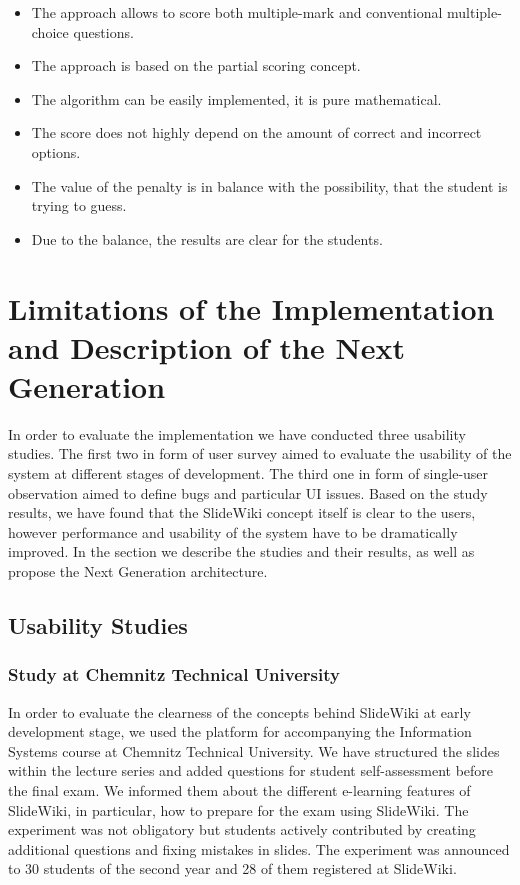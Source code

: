 \documentclass[ngerman,UKenglish,table]{scrbook}
\begin{document}
\begin{itemize}
  \item The approach allows to score both multiple-mark and conventional multiple-choice questions.
  \item The approach is based on the partial scoring concept.
  \item The algorithm can be easily implemented, it is pure mathematical.
  \item The score does not highly depend on the amount of correct and incorrect options.
  \item The value of the penalty is in balance with the possibility, that the student is trying to guess.
  \item Due to the balance, the results are clear for the students.  
\end{itemize}

\section{Limitations of the Implementation and Description of the Next Generation}
\label{slidewiki_limitations}

In order to evaluate the implementation we have conducted three usability studies.
The first two in form of user survey aimed to evaluate the usability of the system at different stages of development. 
The third one in form of single-user observation aimed to define bugs and particular UI issues.
Based on the study results, we have found that the SlideWiki concept itself is clear to the users, however performance and usability of the system have to be dramatically improved.
In the section we describe the studies and their results, as well as propose the Next Generation architecture.


\subsection{Usability Studies}

\subsubsection{Study at Chemnitz Technical University}
In order to evaluate the clearness of the concepts behind SlideWiki at early development stage, we used the platform for accompanying the Information Systems course at Chemnitz Technical University.
We have structured the slides within the lecture series and added questions for student self-assessment before the final exam.
We informed them about the different e-learning features of SlideWiki, in particular, how to prepare for the exam using SlideWiki.
The experiment was not obligatory but students actively contributed by creating additional questions and fixing mistakes in slides.
The experiment was announced to 30 students of the second year and 28 of them registered at SlideWiki.
\end{document}
